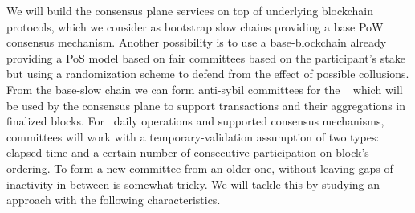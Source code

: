


We will build the consensus plane services on top of underlying blockchain protocols, which we consider as bootstrap slow chains providing a base \gls{PoW} consensus mechanism. Another possibility is to use a base-blockchain already providing a \gls{PoS} model based on fair committees based on the participant's stake but using a randomization scheme to defend from the effect of possible collusions. From the base-slow chain we can form anti-sybil committees for the \mysystem~ which will be used by the consensus plane to support transactions and their aggregations in finalized blocks. For \mysystem~daily operations and supported consensus mechanisms, committees will work with a temporary-validation assumption of two types: elapsed time and a certain number of consecutive participation on block's ordering. To form a new committee from an older one, without leaving gaps of inactivity in between is somewhat tricky. We will tackle this by studying an approach with the following characteristics.

